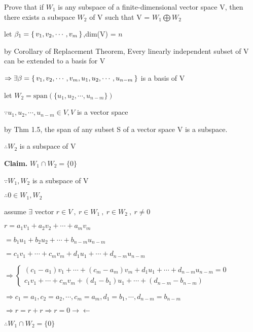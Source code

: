 Prove that if $W_1$ is any subspace of a finite-dimensional vector space V, then there exists a subspace $W_2$ of V such that V = $W_1 \bigoplus W_2$

\begin{tcolorbox}
	\begin{solution}
		let $\beta_1 = \left\{ \,v_1,v_2,\cdots,v_m \,\right\}$,dim(V) = $n$
		
		by Corollary of Replacement Theorem, Every linearly independent subset of V can be extended to a basis for V
		
		$\Rightarrow \exists \beta = \left\{ \,v_1,v_2,\cdots,v_m,u_1,u_2,\cdots,u_{n-m} \,\right\}$ is a basis of V
		
		let $W_2 = \text{span$(\{u_1,u_2,\cdots,u_{n-m}\})$}$
		
		$\because u_1,u_2,\cdots,u_{n-m} \in V,V$ is a vector space 
		
		by Thm 1.5, the span of any subset S of a vector space V is a subspace.
		
		$\therefore W_2$ is a subspace of V
		
		\textbf{Claim.} $W_1 \cap W_2 = \{0\}$
		
		$\because W_1,W_2$ is a subspace of V
		
		$\therefore 0 \in W_1 , W_2$
		
		assume $\exists$ vector $r \in V~,~ r \in W_1~,~ r \in W_2~,~ r \neq 0$
		
		$r = a_1v_1 + a_2v_2 + \cdots + a_mv_m$
		
		$=b_1u_1 + b_2u_2 + \cdots + b_{n-m}u_{n-m}$
		
		$=c_1v_1 + \cdots + c_mv_m + d_1u_1 + \cdots + d_{n-m}u_{n-m}$
		
		$\Rightarrow 
		\begin{cases}
			(c_1-a_1)v_1+\cdots+(c_m-a_m)v_m+d_1u_1+\cdots+d_{n-m}u_{n-m} = 0 \\
			c_1v_1 + \cdots + c_mv_m+(d_1-b_1)u_1 + \cdots + (d_{n-m}-b_{n-m})		
		\end{cases}$
		
		$\Rightarrow c_1 = a_1,c_2=a_2,\cdots,c_m=a_m,d_1=b_1,\cdots,d_{n-m} = b_{n-m}$
		
		$\Rightarrow r = r+r \Rightarrow r=0 \rightarrow\leftarrow$
		
		$\therefore W_1 \cap W_2 = \{0\}$		
	\end{solution}
\end{tcolorbox}